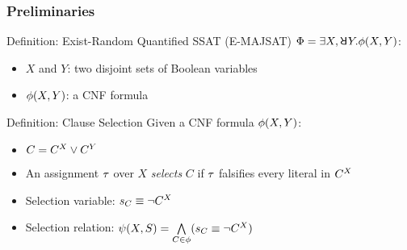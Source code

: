 \begin{frame}
    \frametitle{Preliminaries}
    \begin{block}{Definition: Exist-Random Quantified SSAT (E-MAJSAT)}
        $\Qf=\exists X,\random{} Y.\pf(X,Y)$:
        \begin{itemize}
            \item $X$ and $Y$: two disjoint sets of Boolean variables
            \item $\phi(X,Y)$: a CNF formula
        \end{itemize}
    \end{block}
    \pause
    \begin{block}{Definition: Clause Selection}
        Given a CNF formula $\phi(X,Y)$:
        \begin{itemize}
            \item $C=C^X\lor C^Y$
            \item An assignment $\tau$ over $X$ \textit{selects} $C$ if $\tau$ falsifies every literal in $C^X$
            \item Selection variable: $s_{C}\equiv\lnot C^X$
            \item Selection relation: $\psi(X,S)=\bigwedge\limits_{C\in\phi}(s_{C}\equiv\lnot C^X)$
        \end{itemize}
    \end{block}
\end{frame}